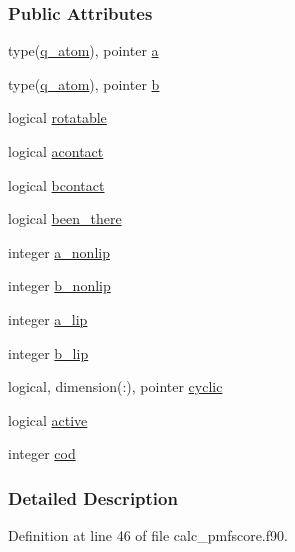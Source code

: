 \subsubsection*{Public Attributes}
\begin{DoxyCompactItemize}
\item 
type(\hyperlink{structcalc__pmf_1_1q__atom}{q\-\_\-atom}), pointer \hyperlink{structcalc__pmf_1_1q__bond_a6ab75e023ec886577d2a9d1ec2312941}{a}
\item 
type(\hyperlink{structcalc__pmf_1_1q__atom}{q\-\_\-atom}), pointer \hyperlink{structcalc__pmf_1_1q__bond_a1e988d86ee0094a8176ad57e5edbe9a1}{b}
\item 
logical \hyperlink{structcalc__pmf_1_1q__bond_a074eb11d621c4b3843ae45a415e7d876}{rotatable}
\item 
logical \hyperlink{structcalc__pmf_1_1q__bond_a7588c68c163c5d407c29559ca5e766c3}{acontact}
\item 
logical \hyperlink{structcalc__pmf_1_1q__bond_ae73e05a4a3a78995e09e5ab0aad5d7c4}{bcontact}
\item 
logical \hyperlink{structcalc__pmf_1_1q__bond_afbe332024661127ec257e15013d302ee}{been\-\_\-there}
\item 
integer \hyperlink{structcalc__pmf_1_1q__bond_a7c5b1ee01d34822352583b44d2cf25b2}{a\-\_\-nonlip}
\item 
integer \hyperlink{structcalc__pmf_1_1q__bond_a2d285a6d3ea22adcc51719298d14d4e3}{b\-\_\-nonlip}
\item 
integer \hyperlink{structcalc__pmf_1_1q__bond_a291994e6e8ce394bca92d8b5889d4c59}{a\-\_\-lip}
\item 
integer \hyperlink{structcalc__pmf_1_1q__bond_ab195c4f156b5952e175a5c95f5de2aac}{b\-\_\-lip}
\item 
logical, dimension(\-:), pointer \hyperlink{structcalc__pmf_1_1q__bond_a8e9ba2622c4e9d5a527e2b5ae52ce3a2}{cyclic}
\item 
logical \hyperlink{structcalc__pmf_1_1q__bond_ae32264128b887aafa67ffa66ae39d453}{active}
\item 
integer \hyperlink{structcalc__pmf_1_1q__bond_a5cdcbd8d3daf0405d37f6b85ebb7144b}{cod}
\end{DoxyCompactItemize}


\subsubsection{Detailed Description}


Definition at line 46 of file calc\-\_\-pmfscore.\-f90.



